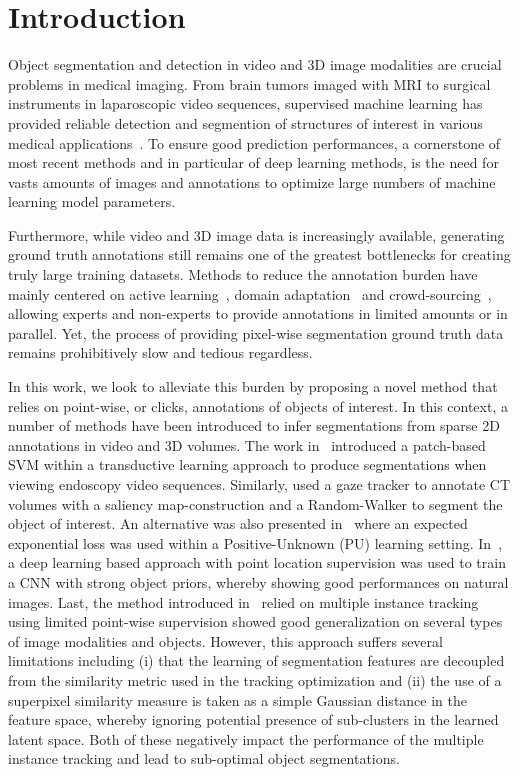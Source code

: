 \section{Introduction}
\label{sec:intro}

Object segmentation and detection in video and 3D image modalities are crucial problems in medical imaging.
From brain tumors imaged with MRI to surgical instruments in laparoscopic video sequences, supervised machine learning has provided reliable detection and segmention of structures of interest in various medical applications~\cite{menze15,sznitman2014,zikic2014}.
To ensure good prediction performances, a cornerstone of most recent methods and in particular of deep learning methods, is the need for vasts amounts of images and annotations to optimize large numbers of machine learning model parameters. 

Furthermore, while video and 3D image data is increasingly available, generating
ground truth annotations still remains one of the greatest bottlenecks
for creating truly large training datasets. Methods to reduce the annotation
burden have mainly centered on active learning~\cite{KonSznFua15,MosSzn16},
domain adaptation~\cite{ShiRoth16,BerBecSalFua2016} and
crowd-sourcing~\cite{Cheplygina2016}, allowing experts and
non-experts to provide annotations in limited amounts or in parallel. Yet, the
process of providing pixel-wise segmentation ground truth data remains prohibitively slow and tedious regardless. 

In this work, we look to alleviate this burden by proposing a novel method that relies on point-wise, or clicks, annotations of objects of interest.
In this context, a number of methods have been introduced to infer segmentations from sparse 2D annotations in video and 3D volumes.
The work in~\cite{vilarino07} introduced a patch-based SVM within a transductive learning approach to produce segmentations when viewing endoscopy video sequences.
Similarly, \cite{khosravan16} used a gaze tracker to annotate CT volumes with a saliency map-construction and a Random-Walker to segment the object of interest.
An alternative was also presented in~\cite{lejeune17} where an expected exponential loss was used within a Positive-Unknown (PU) learning setting.
In~\cite{bearman16}, a deep learning based approach with point location supervision was used to train a CNN with strong object priors, whereby showing good performances on natural images.
Last, the method introduced in~\cite{lejeune18} relied on multiple instance tracking using limited point-wise supervision showed good generalization on several types of image modalities and objects.
However, this approach suffers several limitations including (i) that the learning of segmentation features are decoupled from the similarity metric used in the tracking optimization and (ii) the use of a superpixel similarity measure is taken as a simple Gaussian distance in the feature space, whereby ignoring potential presence of sub-clusters in the learned latent space.
Both of these negatively impact the performance of the multiple instance tracking and lead to sub-optimal object segmentations. 

